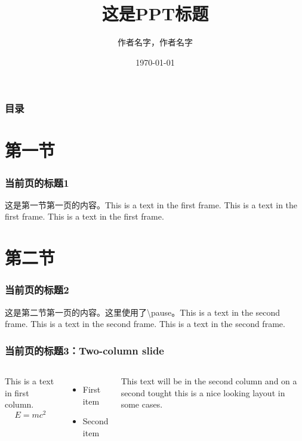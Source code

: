\documentclass{beamer}
\title{这是PPT标题}  %
\author{作者名字\inst{1}，作者名字\inst{2}}     %
\institute{\inst{1}第一个单位\and\inst{2}第二个单位}  %
\date{\today}        %
\begin{document}
	\begin{frame}    %
		\titlepage   %
	\end{frame}
	\begin{frame}
		\frametitle{目录} %
		\tableofcontents  %
	\end{frame}
	
	\section{第一节}    %
	\begin{frame}   
		\frametitle{当前页的标题1}  
		这是第一节第一页的内容。This is a text in the first frame. This is a text in the first frame. This is a text in the first frame.
	\end{frame}
	
	\section{第二节}  
	\begin{frame}  
		\frametitle{当前页的标题2} 
		这是第二节第一页的内容。这里使用了\textbackslash pause。\pause This is a text in the second frame. This is a text in the second frame. This is a text in the second frame.  %
	\end{frame}
	\begin{frame}
	    \frametitle{当前页的标题3：Two-column slide}
	    \begin{columns}   %
	    	This is a text in first column.
	    	$$E=mc^2$$
	    	\begin{itemize}  %
	    		\item First item
	    		\item Second item
	    	\end{itemize}
	    	This text will be in the second column
	    	and on a second tought this is a nice looking
	    	layout in some cases.
	    \end{columns}
	\end{frame}
\end{document}
